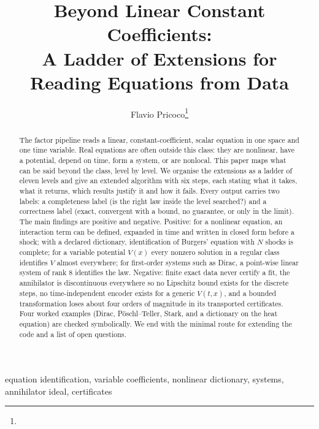 


\title{Beyond Linear Constant Coefficients:\\A Ladder of Extensions for Reading Equations from Data}
\author{Flavio Pricoco\thanks{}}


\maketitle

\begin{abstract}
The factor pipeline reads a linear, constant-coefficient, scalar equation in one space and one time variable. Real equations are
often outside this class: they are nonlinear, have a potential, depend on time, form a system, or are nonlocal. This paper maps what
can be said beyond the class, level by level. We organise the extensions as a ladder of eleven levels and give an extended algorithm with
six steps, each stating what it takes, what it returns, which results justify it and how it fails. Every output carries two labels: a
completeness label (is the right law inside the level searched?) and a correctness label (exact, convergent with a bound, no guarantee, or
only in the limit). The main findings are positive and negative. Positive: for a nonlinear equation, an interaction term can be defined, expanded
in time and written in closed form before a shock; with a declared dictionary, identification of Burgers' equation with $N$ shocks is
complete; for a variable potential $V(x)$ every nonzero solution in a regular class identifies $V$ almost everywhere; for first-order
systems such as Dirac, a point-wise linear system of rank $8$ identifies the law. Negative: finite exact data never certify a fit, the
annihilator is discontinuous everywhere so no Lipschitz bound exists for the discrete steps, no time-independent encoder exists for a generic
$V(t,x)$, and a bounded transformation loses about four orders of magnitude in its transported certificates. Four worked examples (Dirac,
P\"oschl--Teller, Stark, and a dictionary on the heat equation) are checked symbolically. We end with the minimal route for extending the code
and a list of open questions.
\end{abstract}

\begin{keywords}
equation identification, variable coefficients, nonlinear dictionary, systems, annihilator ideal, certificates
\end{keywords}

